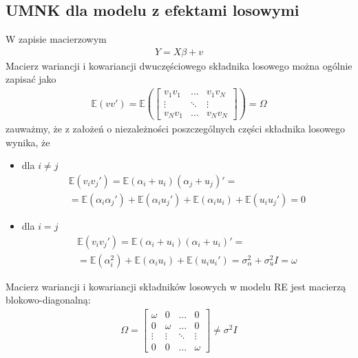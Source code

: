 \subsection{UMNK dla modelu z efektami losowymi}
W zapisie macierzowym
\begin{gather*}
Y=X\beta +v
\end{gather*}
Macierz wariancji i kowariancji dwuczęściowego składnika losowego można ogólnie zapisać jako
\begin{gather*}
\mathbb E \left(vv'\right)=
\mathbb E \left(
\begin{bmatrix}
	v_1v_1 & \ldots & v_1v_N \\
	\vdots & \ddots & \vdots \\
	v_Nv_1 & \ldots & v_Nv_N
\end{bmatrix}
\right)=\Omega
\end{gather*}
zauważmy, że z założeń o niezależności poszczególnych części składnika losowego wynika, że
\begin{itemize}
\item dla $ i\neq j $
\begin{gather*}
\mathbb E \left(v_iv_j'\right)=
\mathbb E \left(\alpha_i+u_i\right)\left(\alpha_j+u_j\right)'
=\\=
\mathbb E \left(\alpha_i\alpha_j'\right)+
\mathbb E \left(\alpha_iu_j'\right)+
\mathbb E \left(\alpha_iu_i\right)+
\mathbb E \left(u_iu_j'\right)=0
\end{gather*}
\item dla $ i=j $
\begin{gather*}
\mathbb E \left(v_iv_j'\right)=
\mathbb E \left(\alpha_i+u_i\right)\left(\alpha_i+u_i\right)'
=\\=
\mathbb E \left(\alpha_i^2\right)+\mathbb E \left(\alpha_iu_i\right)+\mathbb E \left(u_iu_i'\right)=
\sigma_\alpha^2+\sigma_u^2I=\omega
\end{gather*}
\end{itemize}
Macierz wariancji i kowariancji składników losowych w modelu RE jest macierzą blokowo-diagonalną:
\begin{gather*}
\Omega=
\begin{bmatrix}
	\omega & 0      & \ldots & 0      \\
	0      & \omega & \ldots & 0      \\
	\vdots & \vdots & \ddots & \vdots \\
	0      & 0      & \ldots & \omega
\end{bmatrix}\neq\sigma^2I
\end{gather*}
